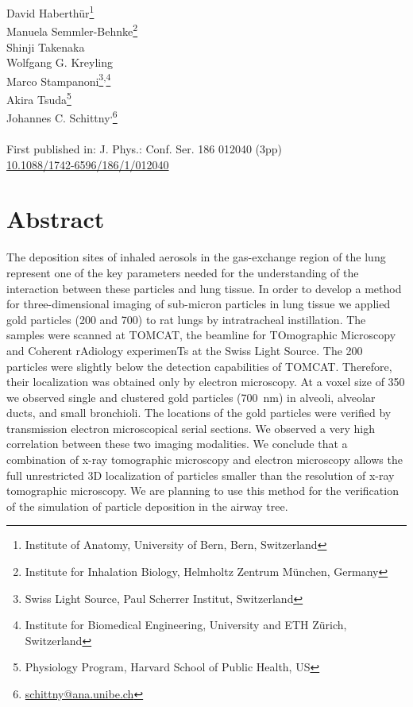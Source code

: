 \label{ch:XRM2008}

\newcommand{\footremember}[2]{\footnote{#2}\newcounter{#1}\setcounter{#1}{\value{footnote}}}%
\newcommand{\footrecall}[1]{\footnotemark[\value{#1}]} 

David Haberthür\footremember{ana}{Institute of Anatomy, University of Bern, Bern, Switzerland}\\
Manuela Semmler-Behnke\footremember{inhalation}{Institute for Inhalation Biology, Helmholtz Zentrum München, Germany}\\
Shinji Takenaka\footrecall{inhalation}\\
Wolfgang G. Kreyling\footrecall{inhalation}\\
Marco Stampanoni\footremember{psi}{Swiss Light Source, Paul Scherrer Institut, Switzerland}\textsuperscript{,}\footremember{eth}{Institute for Biomedical Engineering, University and ETH Zürich, Switzerland}\\
Akira Tsuda\footnote{Physiology Program, Harvard School of Public Health, US}\\
Johannes C. Schittny\footrecall{ana}\textsuperscript{,}\footnote{\href{mailto:schittny@ana.unibe.ch}{schittny@ana.unibe.ch}}\\\\
First published in: J. Phys.: Conf. Ser. 186 012040 (3pp)\\
\href{http://dx.doi.org/doi:10.1088/1742-6596/186/1/012040}{10.1088/1742-6596/186/1/012040}

\section{Abstract}
The deposition sites of inhaled aerosols in the gas-exchange region of the lung represent one of the key parameters needed for the understanding of the interaction between these particles and lung tissue. In order to develop a method for three-dimensional imaging of sub-micron particles in lung tissue we applied gold particles (200 and \unit{700}{\nano\meter}) to rat lungs by intratracheal instillation. The samples were scanned at TOMCAT, the beamline for TOmographic Microscopy and Coherent rAdiology experimenTs at the Swiss Light Source. The \unit{200}{\nano\meter} particles were slightly below the detection capabilities of TOMCAT. Therefore, their localization was obtained only by electron microscopy. At a voxel size of \unit{350}{\nano\meter} we observed single and clustered gold particles (\SI{700}{\nano\meter}) in alveoli, alveolar ducts, and small bronchioli. The locations of the gold particles were verified by transmission electron microscopical serial sections. We observed a very high correlation between these two imaging modalities. We conclude that a combination of x-ray tomographic microscopy and electron microscopy allows the full unrestricted 3D localization of particles smaller than the resolution of x-ray tomographic microscopy. We are planning to use this method for the verification of the simulation of particle deposition in the airway tree.

